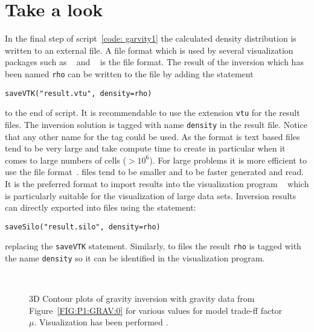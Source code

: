 \section{Take a look}
In the final step of script~\ref{code: garvity1} the calculated density distribution is written to an external file. 
A file format which is used by several visualization packages such as \VisIt~\cite{VISIT} and \mayavi~\cite{MAYAVI}
is the \VTK file format. The result of the inversion which has been named \verb|rho| can be written to the file 
 by adding the statement
\begin{verbatim}
saveVTK("result.vtu", density=rho)
\end{verbatim}
to the end of script. It is recommendable to use the extension \verb|vtu| for the \VTK result files. 
The inversion solution is tagged with name \verb|density| in the result file. Notice that any other
name for the tag could be used. As the format is text based
\VTK files tend to be very large and take compute time to create in particular when it comes to large numbers of cells ($>10^6$).
For large problems it is more efficient to use the \SILO file format~\cite{SILO}. \SILO files tend to be smaller 
and to be faster generated and read. It is the preferred format to import results into the visualization program \VisIt~\cite{VISIT}
which is particularly suitable for the visualization of large data sets. Inversion results can directly exported into \SILO files using
the statement:       
\begin{verbatim}
saveSilo("result.silo", density=rho)
\end{verbatim}
replacing the \verb|saveVTK| statement. Similarly, to \VTK files the result \verb|rho| is tagged 
with the name \verb|density| so it can be identified in the visualization program. 

\begin{figure}
	     \begin{center}
	        \\ %
	    \end{center}
	   \label{FIG:P1:GRAV:10}

\caption{3D Contour plots of gravity inversion with gravity data from Figure~\ref{FIG:P1:GRAV:0} for
various values for model trade-ff factor $\mu$. Visualization has been performed \VisIt. }
\end{figure}

